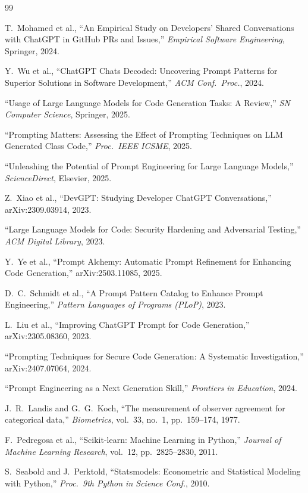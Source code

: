 \documentclass[conference]{IEEEtran}
\begin{document}
\begin{thebibliography}{99}

T.\ Mohamed et al., ``An Empirical Study on Developers' Shared Conversations with ChatGPT in GitHub PRs and Issues,'' \emph{Empirical Software Engineering}, Springer, 2024.

Y.\ Wu et al., ``ChatGPT Chats Decoded: Uncovering Prompt Patterns for Superior Solutions in Software Development,'' \emph{ACM Conf.\ Proc.}, 2024.

``Usage of Large Language Models for Code Generation Tasks: A Review,'' \emph{SN Computer Science}, Springer, 2025.

``Prompting Matters: Assessing the Effect of Prompting Techniques on LLM Generated Class Code,'' \emph{Proc.\ IEEE ICSME}, 2025.

``Unleashing the Potential of Prompt Engineering for Large Language Models,'' \emph{ScienceDirect}, Elsevier, 2025.

Z.\ Xiao et al., ``DevGPT: Studying Developer ChatGPT Conversations,'' arXiv:2309.03914, 2023.

``Large Language Models for Code: Security Hardening and Adversarial Testing,'' \emph{ACM Digital Library}, 2023.

Y.\ Ye et al., ``Prompt Alchemy: Automatic Prompt Refinement for Enhancing Code Generation,'' arXiv:2503.11085, 2025.

D.\ C.\ Schmidt et al., ``A Prompt Pattern Catalog to Enhance Prompt Engineering,'' \emph{Pattern Languages of Programs (PLoP)}, 2023.

L.\ Liu et al., ``Improving ChatGPT Prompt for Code Generation,'' arXiv:2305.08360, 2023.

``Prompting Techniques for Secure Code Generation: A Systematic Investigation,'' arXiv:2407.07064, 2024.

``Prompt Engineering as a Next Generation Skill,'' \emph{Frontiers in Education}, 2024.

J.\ R.\ Landis and G.\ G.\ Koch, ``The measurement of observer agreement for categorical data,'' \emph{Biometrics}, vol.~33, no.~1, pp.~159--174, 1977.

F.\ Pedregosa et al., ``Scikit-learn: Machine Learning in Python,'' \emph{Journal of Machine Learning Research}, vol.~12, pp.~2825--2830, 2011.

S.\ Seabold and J.\ Perktold, ``Statsmodels: Econometric and Statistical Modeling with Python,'' \emph{Proc.\ 9th Python in Science Conf.}, 2010.

\end{thebibliography}
\end{document}
